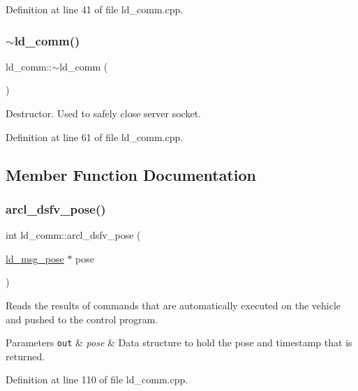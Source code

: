 Definition at line 41 of file ld\+\_\+comm.\+cpp.

\mbox{\label{classld__comm_af403b74c6732802512b416fdcecef916}} 
\subsubsection{\texorpdfstring{$\sim$ld\+\_\+comm()}{~ld\_comm()}}
{\footnotesize\ttfamily ld\+\_\+comm\+::$\sim$ld\+\_\+comm (\begin{DoxyParamCaption}{ }\end{DoxyParamCaption})}

Destructor. Used to safely close server socket. 

Definition at line 61 of file ld\+\_\+comm.\+cpp.



\subsection{Member Function Documentation}
\mbox{\label{classld__comm_a735b4f8a86715cd2fde806ae6f7ba6b3}} 
\subsubsection{\texorpdfstring{arcl\+\_\+dsfv\+\_\+pose()}{arcl\_dsfv\_pose()}}
{\footnotesize\ttfamily int ld\+\_\+comm\+::arcl\+\_\+dsfv\+\_\+pose (\begin{DoxyParamCaption}\item[{\mbox{\hyperlink{structld__msg__pose}{ld\+\_\+msg\+\_\+pose}} $\ast$}]{pose }\end{DoxyParamCaption})}

Reads the results of commands that are automatically executed on the vehicle and pushed to the control program. 
\begin{DoxyParams}[1]{Parameters}
\mbox{\tt out}  & {\em pose} & Data structure to hold the pose and timestamp that is returned. \\
\hline
\end{DoxyParams}


Definition at line 110 of file ld\+\_\+comm.\+cpp.

